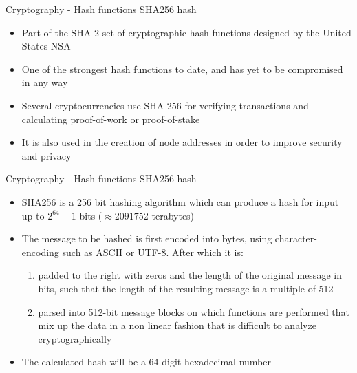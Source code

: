 \documentclass[10pt]{beamer}
\begin{document}

\begin{frame}{Cryptography - Hash functions}
	SHA256 hash
	\begin{itemize}
		\item Part of the SHA-2 set of cryptographic hash functions designed by the United States NSA
		\item One of the strongest hash functions to date, and has yet to be compromised in any way
		\item Several cryptocurrencies use SHA-256 for verifying transactions and calculating proof-of-work or proof-of-stake
		\item It is also used in the creation of node addresses in order to improve security and privacy
	\end{itemize}
\end{frame}


\begin{frame}{Cryptography - Hash functions}
	SHA256 hash
	\begin{itemize}
		\item SHA256 is a 256 bit hashing algorithm which can produce a hash for input up to $ 2^{64}-1$ bits ($\approx  2 091 752$ terabytes)
		\item The message to be hashed is first encoded into bytes, using character-encoding such as ASCII or UTF-8. After which it is:
		\begin{enumerate}
			\item padded to the right with zeros and the length of the original message in bits, such that the length of the resulting message is a multiple of 512
			\item parsed into 512-bit message blocks on which functions are performed that mix up the data in a non linear fashion that is difficult to analyze cryptographically
		\end{enumerate}
		\item The calculated hash will be a 64 digit hexadecimal number
	\end{itemize}
\end{frame}

\end{document}
